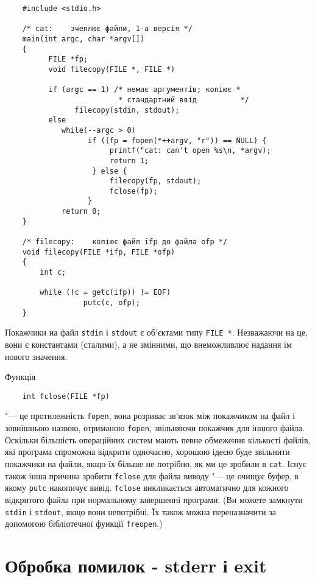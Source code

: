\documentclass[a4paper,12pt]{book}
\begin{document}
  \begin{verbatim}
    #include <stdio.h>

    /* cat:    зчеплює файли, 1-а версія */
    main(int argc, char *argv[])
    {
          FILE *fp;
          void filecopy(FILE *, FILE *)

          if (argc == 1) /* немає аргументів; копіює *
                          * стандартний ввід          */
                filecopy(stdin, stdout);
          else
             while(--argc > 0)
                   if ((fp = fopen(*++argv, "r")) == NULL) {
                        printf("cat: can't open %s\n, *argv);
                        return 1;
                    } else {
                        filecopy(fp, stdout);
                        fclose(fp);
                   }
             return 0;
    }

    /* filecopy:    копіює файл ifp до файла ofp */
    void filecopy(FILE *ifp, FILE *ofp)
    {
        int c;

        while ((c = getc(ifp)) != EOF)
                  putc(c, ofp);
    }
  \end{verbatim}

  Покажчики на файл \texttt{stdin} і \texttt{stdout} є об'єктами типу \texttt{FILE
  *}. Незважаючи на це, вони є константами (сталими), а не змінними, що внеможливлює
  надання їм нового значення.

  Функція
  \begin{verbatim}
    int fclose(FILE *fp)
  \end{verbatim}
  "--- це протилежність \texttt{fopen}, вона розриває зв'язок між покажчиком на файл і
  зовнішньою назвою, отриманою \texttt{fopen}, звільняючи покажчик для іншого файла.
  Оскільки більшість операційних систем мають певне обмеження кількості файлів, які
  програма спроможна відкрити одночасно, хорошою ідеєю буде звільнити покажчики на файли,
  якщо їх більше не потрібно, як ми це зробили в \texttt{cat}. Існує також інша причина
  зробити \texttt{fclose} для файла виводу "--- це очищує буфер, в якому \texttt{putc}
  накопичує вивід. \texttt{fclose} викликається автоматично для кожного відкритого файла
  при нормальному завершенні програми. (Ви можете замкнути \texttt{stdin} і
  \texttt{stdout}, якщо вони непотрібні. Їх також можна переназначити за допомогою
  бібліотечної функції \texttt{freopen}.)

\section{Обробка помилок - stderr і exit}
\end{document}
